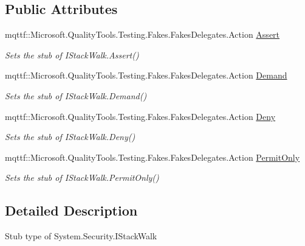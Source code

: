 \subsection*{Public Attributes}
\begin{DoxyCompactItemize}
\item 
mqttf\-::\-Microsoft.\-Quality\-Tools.\-Testing.\-Fakes.\-Fakes\-Delegates.\-Action \hyperlink{class_system_1_1_security_1_1_fakes_1_1_stub_i_stack_walk_aa267231d639556f1a946bc892db22a7f}{Assert}
\begin{DoxyCompactList}\small\item\em Sets the stub of I\-Stack\-Walk.\-Assert()\end{DoxyCompactList}\item 
mqttf\-::\-Microsoft.\-Quality\-Tools.\-Testing.\-Fakes.\-Fakes\-Delegates.\-Action \hyperlink{class_system_1_1_security_1_1_fakes_1_1_stub_i_stack_walk_a6e90566190e7a191849a85baefe72c35}{Demand}
\begin{DoxyCompactList}\small\item\em Sets the stub of I\-Stack\-Walk.\-Demand()\end{DoxyCompactList}\item 
mqttf\-::\-Microsoft.\-Quality\-Tools.\-Testing.\-Fakes.\-Fakes\-Delegates.\-Action \hyperlink{class_system_1_1_security_1_1_fakes_1_1_stub_i_stack_walk_ae706b00c65a996b83a997dc19630d49c}{Deny}
\begin{DoxyCompactList}\small\item\em Sets the stub of I\-Stack\-Walk.\-Deny()\end{DoxyCompactList}\item 
mqttf\-::\-Microsoft.\-Quality\-Tools.\-Testing.\-Fakes.\-Fakes\-Delegates.\-Action \hyperlink{class_system_1_1_security_1_1_fakes_1_1_stub_i_stack_walk_a636ea81a4182eccb52323010dea8a2c1}{Permit\-Only}
\begin{DoxyCompactList}\small\item\em Sets the stub of I\-Stack\-Walk.\-Permit\-Only()\end{DoxyCompactList}\end{DoxyCompactItemize}


\subsection{Detailed Description}
Stub type of System.\-Security.\-I\-Stack\-Walk



